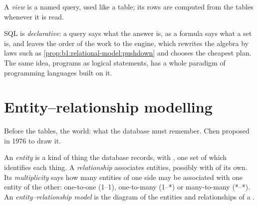 \label{out:b1:relational-model:nested}

\begin{definition}[View]\label{def:b1:relational-model:view}
A \emph{view} is a named query, used like a table; its rows are computed from the tables whenever it is read.
\end{definition}

\label{out:b1:relational-model:views}

SQL is \emph{declarative}: a query says what the answer is, as a formula says what a set is, and leaves the order of the
work to the engine, which rewrites the algebra by laws such as \cref{prop:b1:relational-model:pushdown} and chooses the
cheapest plan. The same idea, programs as logical statements, has a whole paradigm of programming languages built on
it.

\section{Entity--relationship modelling}\label{sec:b1:relational-model:er}

Before the tables, the world: what the database must remember. Chen proposed in 1976 to draw it.

\begin{definition}\label{def:b1:relational-model:er}
An \emph{entity} is a kind of thing the database records, with , one set of which identifies
each thing. A \emph{relationship} associates entities, possibly with  of its
own. Its \emph{multiplicity} says how many entities of one side may be associated
with one entity of the other: one-to-one (1--1), one-to-many (1--*) or many-to-many (*--*). An \emph{entity--relationship
model} is the diagram of the entities and relationships of a .
\end{definition}

